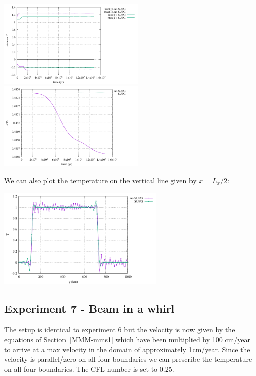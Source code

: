 \begin{center}
\includegraphics[width=7cm]{python_codes/fieldstone_43/results/experiment6/stats_T}
\includegraphics[width=7cm]{python_codes/fieldstone_43/results/experiment6/avrg_T}
\end{center}

We can also plot the temperature on the vertical line given by $x=L_x/2$:
\begin{center}
\includegraphics[width=8cm]{python_codes/fieldstone_43/results/experiment6/diagonal}
\end{center}


\newpage
\subsection*{Experiment 7 - Beam in a whirl}

The setup is identical to experiment 6 but the velocity is now 
given by the equations of Section~\ref{MMM-mms1} which have been multiplied by 100 cm/year 
to arrive at a max velocity in the domain of approximately 1cm/year.
Since the velocity is parallel/zero on all four boundaries we can prescribe the 
temperature on all four boundaries. The CFL number is set to 0.25.

